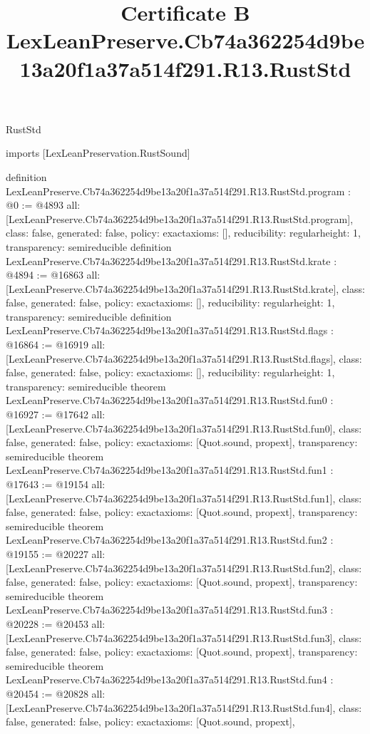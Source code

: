 \begin{lexlean}{RustStd}
\title{Certificate B LexLeanPreserve.Cb74a362254d9be13a20f1a37a514f291.R13.RustStd}
\begin{coremodule}
imports [LexLeanPreservation.RustSound]

definition LexLeanPreserve.Cb74a362254d9be13a20f1a37a514f291.R13.RustStd.program : @0 := @4893 {
  all: [LexLeanPreserve.Cb74a362254d9be13a20f1a37a514f291.R13.RustStd.program],
  class: false,
  generated: false,
  policy: exact{axioms: []},
  reducibility: regular{height: 1},
  transparency: semireducible
}
definition LexLeanPreserve.Cb74a362254d9be13a20f1a37a514f291.R13.RustStd.krate : @4894 := @16863 {
  all: [LexLeanPreserve.Cb74a362254d9be13a20f1a37a514f291.R13.RustStd.krate],
  class: false,
  generated: false,
  policy: exact{axioms: []},
  reducibility: regular{height: 1},
  transparency: semireducible
}
definition LexLeanPreserve.Cb74a362254d9be13a20f1a37a514f291.R13.RustStd.flags : @16864 := @16919 {
  all: [LexLeanPreserve.Cb74a362254d9be13a20f1a37a514f291.R13.RustStd.flags],
  class: false,
  generated: false,
  policy: exact{axioms: []},
  reducibility: regular{height: 1},
  transparency: semireducible
}
theorem LexLeanPreserve.Cb74a362254d9be13a20f1a37a514f291.R13.RustStd.fun0 : @16927 := @17642 {
  all: [LexLeanPreserve.Cb74a362254d9be13a20f1a37a514f291.R13.RustStd.fun0],
  class: false,
  generated: false,
  policy: exact{axioms: [Quot.sound, propext]},
  transparency: semireducible
}
theorem LexLeanPreserve.Cb74a362254d9be13a20f1a37a514f291.R13.RustStd.fun1 : @17643 := @19154 {
  all: [LexLeanPreserve.Cb74a362254d9be13a20f1a37a514f291.R13.RustStd.fun1],
  class: false,
  generated: false,
  policy: exact{axioms: [Quot.sound, propext]},
  transparency: semireducible
}
theorem LexLeanPreserve.Cb74a362254d9be13a20f1a37a514f291.R13.RustStd.fun2 : @19155 := @20227 {
  all: [LexLeanPreserve.Cb74a362254d9be13a20f1a37a514f291.R13.RustStd.fun2],
  class: false,
  generated: false,
  policy: exact{axioms: [Quot.sound, propext]},
  transparency: semireducible
}
theorem LexLeanPreserve.Cb74a362254d9be13a20f1a37a514f291.R13.RustStd.fun3 : @20228 := @20453 {
  all: [LexLeanPreserve.Cb74a362254d9be13a20f1a37a514f291.R13.RustStd.fun3],
  class: false,
  generated: false,
  policy: exact{axioms: [Quot.sound, propext]},
  transparency: semireducible
}
theorem LexLeanPreserve.Cb74a362254d9be13a20f1a37a514f291.R13.RustStd.fun4 : @20454 := @20828 {
  all: [LexLeanPreserve.Cb74a362254d9be13a20f1a37a514f291.R13.RustStd.fun4],
  class: false,
  generated: false,
  policy: exact{axioms: [Quot.sound, propext]},
}
\end{coremodule}
\end{lexlean}
